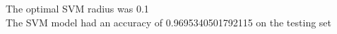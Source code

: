 \begin{answer}
\\ \\ 
The optimal SVM radius was 0.1 \\ 
The SVM model had an accuracy of 0.9695340501792115 on the testing set
\\ \\
\end{answer}
